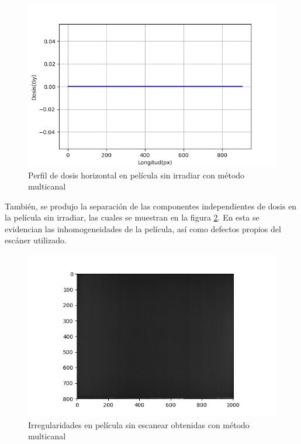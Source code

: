 \begin{figure}[H]
	\centering
	\includegraphics[width=0.7\linewidth]{images/perfilHorizontalDeDosisCeroMulticanal.png}
	\caption{Perfil de dosis horizontal en película sin irradiar con método multicanal }
	\label{fig:perfilCero}
\end{figure}

También, se produjo la separación de las componentes independientes de dosis en la película sin irradiar, las cuales se muestran en la figura \ref{fig:irregularCero}. En esta se evidencian las inhomogeneidades de la película, así como defectos propios del escáner utilizado.\\ 
\begin{figure}[H]
	\centering
	\includegraphics[width=0.7\linewidth]{images/fondoIndependienteDosisPeliculaCero.png}
	\caption{Irregularidades en película sin escanear obtenidas con método multicanal }
	\label{fig:irregularCero}
\end{figure}

